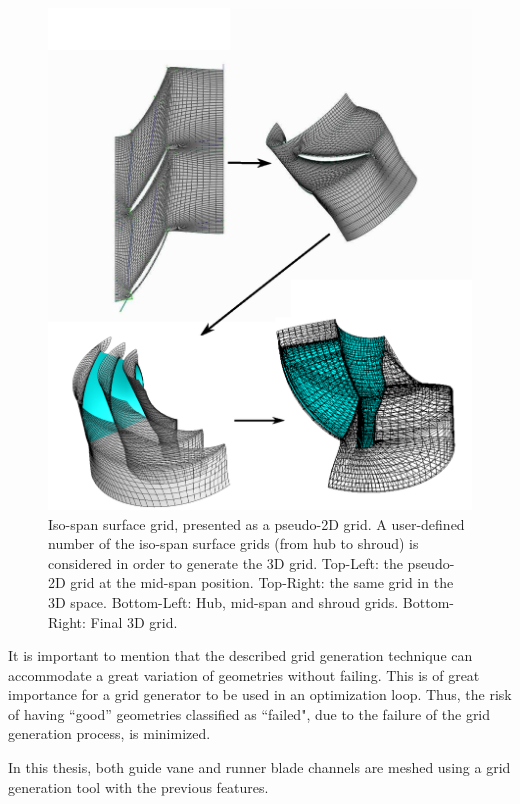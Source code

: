 \begin{figure}[h!]
\centering
\includegraphics[width=140mm]{merid.eps} 
\caption{Iso-span surface grid, presented as a pseudo-2D grid. A user-defined number of the iso-span surface grids (from hub to shroud) is considered in order to generate the 3D grid. Top-Left: the pseudo-2D grid at the mid-span position. Top-Right: the same grid in the 3D space. Bottom-Left: Hub, mid-span and shroud grids. Bottom-Right: Final 3D grid.}
\label{grid4}
\end{figure}

It is important to mention that the described grid generation technique can accommodate a great variation of geometries without failing. This is of great importance for a grid generator to be used in an optimization loop. Thus, the risk of having ``good'' geometries classified as ``failed", due to the failure of the grid generation process, is minimized. 

In this thesis, both guide vane and runner blade channels are meshed using a grid generation tool with the previous features. 

